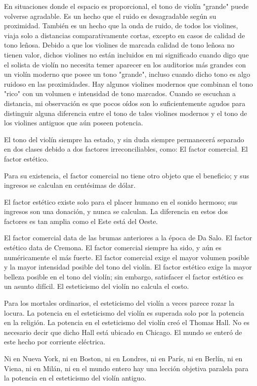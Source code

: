\documentclass[12pt]{book}
\begin{document}
En situaciones donde el espacio es proporcional, el tono de violín "grande" puede volverse agradable. Es un hecho que el ruido es desagradable según su proximidad. También es un hecho que la onda de ruido, de todos los violines, viaja solo a distancias comparativamente cortas, excepto en casos de calidad de tono leñosa. Debido a que los violines de marcada calidad de tono leñosa no tienen valor, dichos violines no están incluidos en mi significado cuando digo que el solista de violín no necesita temer aparecer en los auditorios más grandes con un violín moderno que posee un tono "grande", incluso cuando dicho tono es algo ruidoso en las proximidades. Hay algunos violines modernos que combinan el tono "rico" con un volumen e intensidad de tono marcados. Cuando se escuchan a distancia, mi observación es que pocos oídos son lo suficientemente agudos para distinguir alguna diferencia entre el tono de tales violines modernos y el tono de los violines antiguos que aún poseen potencia.

El tono del violín siempre ha estado, y sin duda siempre permanecerá separado en dos clases debido a dos factores irreconciliables, como: El factor comercial. El factor estético.

Para su existencia, el factor comercial no tiene otro objeto que el beneficio; y sus ingresos se calculan en centésimas de dólar.

El factor estético existe solo para el placer humano en el sonido hermoso; sus ingresos son una donación, y nunca se calculan. La diferencia en estos dos factores es tan amplia como el Este está del Oeste.

El factor comercial data de las brumas anteriores a la época de Da Salo. El factor estético data de Cremona. El factor comercial siempre ha sido, y aún es numéricamente el más fuerte. El factor comercial exige el mayor volumen posible y la mayor intensidad posible del tono del violín. El factor estético exige la mayor belleza posible en el tono del violín; sin embargo, satisfacer el factor estético es un asunto difícil. El esteticismo del violín no calcula el costo.

Para los mortales ordinarios, el esteticismo del violín a veces parece rozar la locura. La potencia en el esteticismo del violín es superada solo por la potencia en la religión. La potencia en el esteticismo del violín creó el Thomas Hall. No es necesario decir que dicho Hall está ubicado en Chicago. El mundo se enteró de este hecho por corriente eléctrica.

Ni en Nueva York, ni en Boston, ni en Londres, ni en París, ni en Berlín, ni en Viena, ni en Milán, ni en el mundo entero hay una lección objetiva paralela para la potencia en el esteticismo del violín antiguo.
\end{document}

